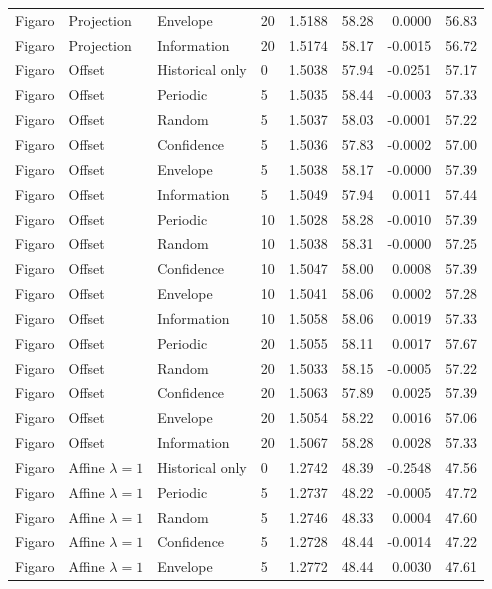 \begin{longtable}{llllrrrr}
Figaro & Projection & Envelope & 20 & 1.5188 & 58.28 & 0.0000 & 56.83 \\
Figaro & Projection & Information & 20 & 1.5174 & 58.17 & -0.0015 & 56.72 \\
Figaro & Offset & Historical only & 0 & 1.5038 & 57.94 & -0.0251 & 57.17 \\
Figaro & Offset & Periodic & 5 & 1.5035 & 58.44 & -0.0003 & 57.33 \\
Figaro & Offset & Random & 5 & 1.5037 & 58.03 & -0.0001 & 57.22 \\
Figaro & Offset & Confidence & 5 & 1.5036 & 57.83 & -0.0002 & 57.00 \\
Figaro & Offset & Envelope & 5 & 1.5038 & 58.17 & -0.0000 & 57.39 \\
Figaro & Offset & Information & 5 & 1.5049 & 57.94 & 0.0011 & 57.44 \\
Figaro & Offset & Periodic & 10 & 1.5028 & 58.28 & -0.0010 & 57.39 \\
Figaro & Offset & Random & 10 & 1.5038 & 58.31 & -0.0000 & 57.25 \\
Figaro & Offset & Confidence & 10 & 1.5047 & 58.00 & 0.0008 & 57.39 \\
Figaro & Offset & Envelope & 10 & 1.5041 & 58.06 & 0.0002 & 57.28 \\
Figaro & Offset & Information & 10 & 1.5058 & 58.06 & 0.0019 & 57.33 \\
Figaro & Offset & Periodic & 20 & 1.5055 & 58.11 & 0.0017 & 57.67 \\
Figaro & Offset & Random & 20 & 1.5033 & 58.15 & -0.0005 & 57.22 \\
Figaro & Offset & Confidence & 20 & 1.5063 & 57.89 & 0.0025 & 57.39 \\
Figaro & Offset & Envelope & 20 & 1.5054 & 58.22 & 0.0016 & 57.06 \\
Figaro & Offset & Information & 20 & 1.5067 & 58.28 & 0.0028 & 57.33 \\
Figaro & Affine $\lambda=1$ & Historical only & 0 & 1.2742 & 48.39 & -0.2548 & 47.56 \\
Figaro & Affine $\lambda=1$ & Periodic & 5 & 1.2737 & 48.22 & -0.0005 & 47.72 \\
Figaro & Affine $\lambda=1$ & Random & 5 & 1.2746 & 48.33 & 0.0004 & 47.60 \\
Figaro & Affine $\lambda=1$ & Confidence & 5 & 1.2728 & 48.44 & -0.0014 & 47.22 \\
Figaro & Affine $\lambda=1$ & Envelope & 5 & 1.2772 & 48.44 & 0.0030 & 47.61 \\

\end{longtable}
